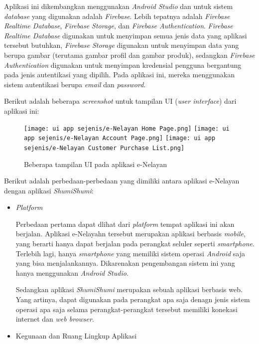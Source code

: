 \documentclass[a4paper]{article}
\begin{document}
\begin{enumerate}
    Aplikasi ini dikembangkan menggunakan \textit{Android Studio} dan untuk sistem \textit{database} yang digunakan adalah \textit{Firebase}. Lebih tepatnya adalah \textit{Firebase Realtime Database}, \textit{Firebase Storage}, dan \textit{Firebase Authentication}. \textit{Firebase Realtime Database} digunakan untuk menyimpan semua jenis data yang aplikasi tersebut butuhkan, \textit{Firebase Storage} digunakan untuk menyimpan data yang berupa gambar (terutama gambar profil dan gambar produk), sedangkan \textit{Firebase Authentication} digunakan untuk menyimpan kredensial pengguna bergantung pada jenis autentikasi yang dipilih. Pada aplikasi ini, mereka menggunakan sistem autentikasi berupa \textit{email} dan \textit{password}\autocite{fishes-marketplace}.

    Berikut adalah beberapa \textit{screenshot} untuk tampilan UI (\textit{user interface}) dari aplikasi ini:
    \begin{figure}[h]
        \texttt{[image: ui app sejenis/e-Nelayan Home Page.png]}\hfill
        \texttt{[image: ui app sejenis/e-Nelayan Account Page.png]}\hfill
        \texttt{[image: ui app sejenis/e-Nelayan Customer Purchase List.png]}
        \caption{Beberapa tampilan UI pada aplikasi e-Nelayan}
    \end{figure}

    Berikut adalah perbedaan-perbedaan yang dimiliki antara aplikasi e-Nelayan dengan aplikasi \textit{ShumiShumi}:

    \begin{itemize}
        \item \textit{Platform}

        Perbedaan pertama dapat dlihat dari \textit{platform} tempat aplikasi ini akan berjalan. Aplikasi e-Nelayahn tersebut merupakan aplikasi berbasis \textit{mobile}, yang berarti hanya dapat berjalan pada perangkat seluler seperti \textit{smartphone}. Terlebih lagi, hanya \textit{smartphone} yang memiliki sistem operasi \textit{Android} saja yang bisa menjalankannya. Dikarenakan pengembangan sistem ini yang hanya menggunakan \textit{Android Studio}\autocite{fishes-marketplace}.

        Sedangkan aplikasi \textit{ShumiShumi} merupakan sebuah aplikasi berbasis web. Yang artinya, dapat digunakan pada perangkat apa saja denagn jenis sistem operasi apa saja selama perangkat-perangkat tersebut memiliki konekasi internet dan \textit{web browser}.

        \item Kegunaan dan Ruang Lingkup Aplikasi


\end{itemize}
\end{enumerate}
\end{document}
